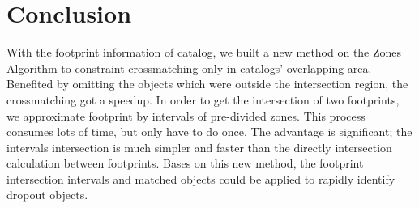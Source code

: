 \section{Conclusion}
With the footprint information of catalog, we built a new method on the Zones Algorithm to constraint crossmatching only in catalogs' overlapping area. Benefited by omitting the objects which were outside the intersection region, the crossmatching got a speedup. In order to get the intersection of two footprints, we approximate footprint by intervals of pre-divided zones. This process consumes lots of time, but only have to do once. The advantage is significant; the intervals intersection is much simpler and faster than the directly intersection calculation between footprints. Bases on this new method, the footprint intersection intervals and matched objects could be applied to rapidly identify dropout objects.



